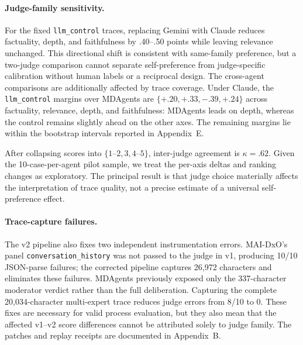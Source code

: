 \documentclass[letterpaper]{article} %
\begin{document}
\paragraph{Judge-family sensitivity.}
For the fixed \texttt{llm\_control} traces, replacing Gemini with Claude reduces factuality, depth, and faithfulness by .40--.50 points while leaving relevance unchanged. This directional shift is consistent with same-family preference, but a two-judge comparison cannot separate self-preference from judge-specific calibration without human labels or a reciprocal design. The cross-agent comparisons are additionally affected by trace coverage. Under Claude, the \texttt{llm\_control} margins over MDAgents are $\{+.20,+.33,-.39,+.24\}$ across factuality, relevance, depth, and faithfulness: MDAgents leads on depth, whereas the control remains slightly ahead on the other axes. The remaining margins lie within the bootstrap intervals reported in Appendix~E.

After collapsing scores into $\{1$--$2,3,4$--$5\}$, inter-judge agreement is $\kappa=.62$. Given the 10-case-per-agent pilot sample, we treat the per-axis deltas and ranking changes as exploratory. The principal result is that judge choice materially affects the interpretation of trace quality, not a precise estimate of a universal self-preference effect.

\paragraph{Trace-capture failures.}
The v2 pipeline also fixes two independent instrumentation errors. MAI-DxO's panel \texttt{conversation\_history} was not passed to the judge in v1, producing 10/10 JSON-parse failures; the corrected pipeline captures 26,972 characters and eliminates these failures. MDAgents previously exposed only the 337-character moderator verdict rather than the full deliberation. Capturing the complete 20,034-character multi-expert trace reduces judge errors from 8/10 to 0. These fixes are necessary for valid process evaluation, but they also mean that the affected v1--v2 score differences cannot be attributed solely to judge family. The patches and replay receipts are documented in Appendix~B.
\end{document}
